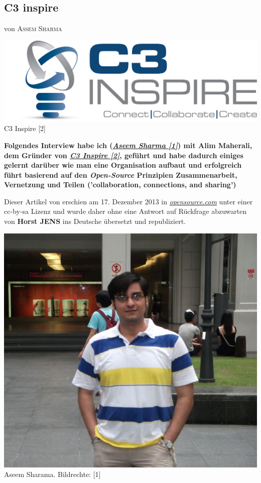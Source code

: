 \documentclass[10pt,a4paper,ngerman,twoside]{article} %
\newcommand{\NewsItem}[1]{ %
\usefont{T1}{fvs}{n}{n} %
\vspace{24pt}\large #1\vspace{3pt} %
\par \normalsize \normalfont}
\newcommand{\NewsAuthor}[1]{ %
\hfill von \textsc{#1} \vspace{20pt} %
\par \normalfont}
\begin{document}
\begin{multicols}{3}
\NewsItem{}
\section*{C3 inspire}
\label{c3inspire}
\NewsAuthor{Assem Sharma}
\begin{center}
\includegraphics[width=0.8\linewidth]{c3inspire/c3inspire.png}\\
\footnotesize{C3 Inspire [2]}
\end{center}

\textbf{Folgendes Interview habe ich (\href{http://aseemsharma.info/about-me/aseemsharma/}{\textit{Aseem Sharma [1]}}) mit Alim Maherali, dem Gründer von \href{http://c3inspire.com}{\textit{C3 Inspire [2]}}, geführt und habe dadurch einiges gelernt darüber wie man eine Organisation aufbaut und erfolgreich führt basierend auf den \textit{Open-Source} Prinzipien Zusammenarbeit, Vernetzung und Teilen ('collaboration, connections, and sharing')}

Dieser Artikel von  erschien am 17. Dezember 2013 in \href{http://opensource.com/education/13/12/interview-Alim-Maherali-C3-Inspire}{\textit{opensource.com}} unter einer cc-by-sa Lizenz und wurde daher ohne eine Antwort auf Rückfrage abzuwarten von  \textbf{Horst JENS} ins Deutsche übersetzt und republiziert.\\

\begin{center}
\includegraphics[width=0.7\linewidth]{c3inspire/c3inspire_aseemsharma.jpg} \\
\footnotesize{Aseem Sharama. Bildrechte: [1]}
\end{center}


\end{multicols}
\end{document}
